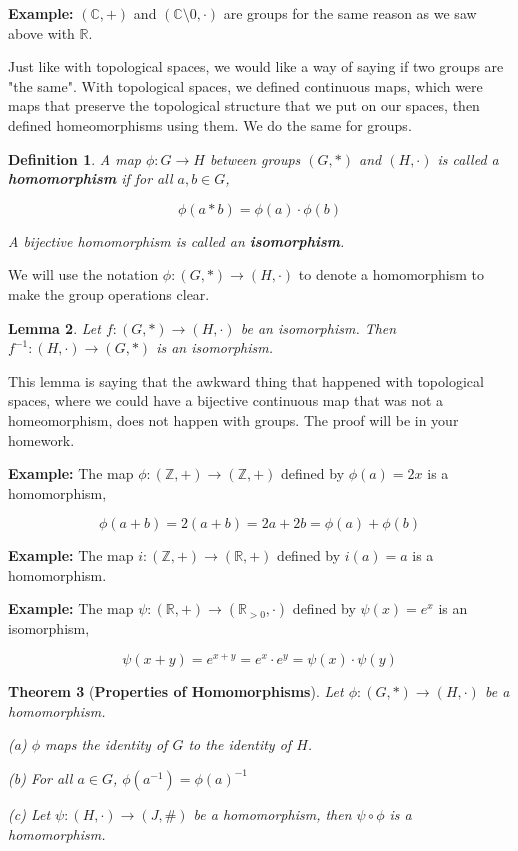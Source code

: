 \documentclass[a4paper]{article}
\newtheorem{theorem}{Theorem}
\newtheorem{lemma}[theorem]{Lemma}
\newtheorem{definition}[theorem]{Definition}
\numberwithin{theorem}{section}
\begin{document}
\textbf{Example:} $(\mathbb{C},+)$ and $(\mathbb{C} \setminus 0,\cdot)$ are groups for the same reason as we saw above with $\mathbb{R}$.

Just like with topological spaces, we would like a way of saying if two groups are "the same". With topological spaces, we defined continuous maps, which were maps that preserve the topological structure that we put on our spaces, then defined homeomorphisms using them. We do the same for groups.

\begin{definition}
A map $\phi: G \rightarrow H$ between groups $(G, \ast)$ and $(H,\cdot)$ is called a \textbf{homomorphism} if for all $a,b \in G$,

$$ \phi(a \ast b) = \phi (a) \cdot \phi (b) $$

A bijective homomorphism is called an \textbf{isomorphism}.
\end{definition}

We will use the notation $\phi: (G, \ast) \rightarrow (H, \cdot)$ to denote a homomorphism to make the group operations clear.

\begin{lemma}
Let $f: (G,\ast) \rightarrow (H,\cdot)$ be an isomorphism. Then $f^{-1}: (H,\cdot) \rightarrow (G,\ast)$ is an isomorphism.
\end{lemma}

This lemma is saying that the awkward thing that happened with topological spaces, where we could have a bijective continuous map that was not a homeomorphism, does not happen with groups. The proof will be in your homework.

\textbf{Example:} The map $\phi: (\mathbb{Z},+) \rightarrow (\mathbb{Z},+)$ defined by $\phi(a) = 2x$ is a homomorphism,

$$ \phi(a + b) = 2(a + b) = 2a + 2b = \phi(a) + \phi(b) $$

\textbf{Example:} The map $i: (\mathbb{Z},+) \rightarrow (\mathbb{R},+)$ defined by $i(a) = a$ is a homomorphism.

\textbf{Example:} The map $\psi: (\mathbb{R},+) \rightarrow (\mathbb{R}_{>0},\cdot)$ defined by $\psi(x) = e^x$ is an isomorphism,

$$ \psi(x+y) = e^{x+y} = e^x \cdot e^y = \psi(x) \cdot \psi(y) $$

\begin{theorem}[\textbf{Properties of Homomorphisms}]
Let $\phi: (G,\ast) \rightarrow (H,\cdot)$ be a homomorphism.

(a) $\phi$ maps the identity of $G$ to the identity of $H$.

(b) For all $a \in G$, $\phi(a^{-1}) = \phi(a)^{-1}$

(c) Let $\psi: (H,\cdot) \rightarrow (J,\#)$ be a homomorphism, then $\psi \circ \phi$ is a homomorphism.

\end{theorem}
\end{document}
